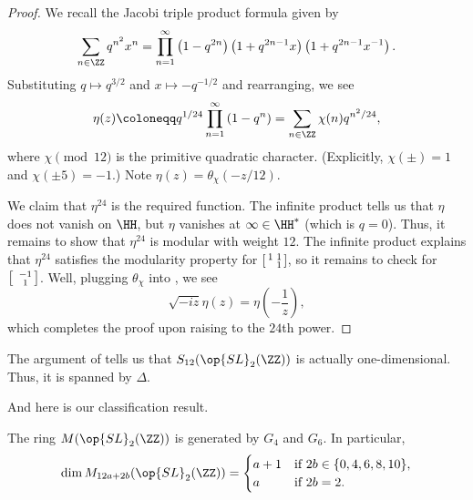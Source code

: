 \documentclass{article}
\begin{document}
\begin{proof}
	We recall the Jacobi triple product formula given by
	\[\sum_{n\in\ZZ}q^{n^2}x^n=\prod_{n=1}^\infty\left(1-q^{2n}\right)\left(1+q^{2n-1}x\right)\left(1+q^{2n-1}x^{-1}\right).\]
	Substituting $q\mapsto q^{3/2}$ and $x\mapsto-q^{-1/2}$ and rearranging, we see
	\[\eta(z)\coloneqq q^{1/24}\prod_{n=1}^\infty\left(1-q^n\right)=\sum_{n\in\ZZ}\chi(n)q^{n^2/24},\]
	where $\chi\pmod{12}$ is the primitive quadratic character. (Explicitly, $\chi(\pm)=1$ and $\chi(\pm5)=-1$.) Note $\eta(z)=\theta_\chi(-z/12)$.

	We claim that $\eta^{24}$ is the required function. The infinite product tells us that $\eta$ does not vanish on $\HH$, but $\eta$ vanishes at $\infty\in\HH^*$ (which is $q=0$). Thus, it remains to show that $\eta^{24}$ is modular with weight $12$. The infinite product explains that $\eta^{24}$ satisfies the modularity property for $\begin{bsmallmatrix}
		1 & 1 \\ & 1
	\end{bsmallmatrix}$, so it remains to check for $\begin{bsmallmatrix}
		& -1 \\ & 1
	\end{bsmallmatrix}$. Well, plugging $\theta_\chi$ into , we see
	\[\sqrt{-iz}\eta(z)=\eta\left(-\frac1z\right),\]
	which completes the proof upon raising to the $24$th power.
\end{proof}
\begin{remark}
	The argument of  tells us that $S_{12}(\op{SL}_2(\ZZ))$ is actually one-dimensional. Thus, it is spanned by $\Delta$.
\end{remark}
And here is our classification result.
\begin{theorem}
	The ring $M(\op{SL}_2(\ZZ))$ is generated by $G_4$ and $G_6$. In particular,
	\[\dim M_{12a+2b}(\op{SL}_2(\ZZ))=\begin{cases}
		a+1 & \text{if }2b\in\{0,4,6,8,10\}, \\
		a & \text{if }2b=2.
	\end{cases}\]
\end{theorem}
\end{document}
